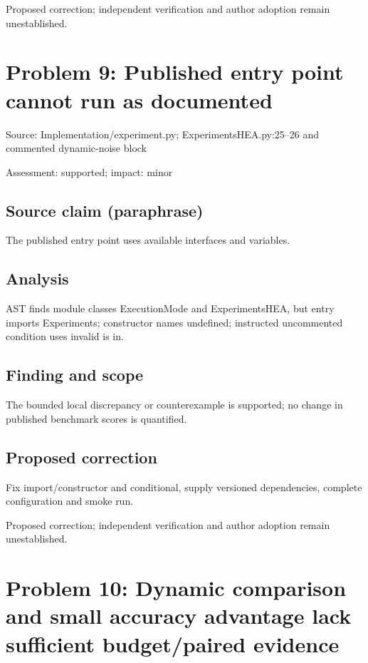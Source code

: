 \documentclass[11pt]{article}
\begin{document}
Proposed correction; independent verification and author adoption remain unestablished.

\section*{Problem 9: Published entry point cannot run as documented}

Source: Implementation/experiment.py; ExperimentsHEA.py:25–26 and commented dynamic-noise block

Assessment: supported; impact: minor

\subsection*{Source claim (paraphrase)}

The published entry point uses available interfaces and variables.

\subsection*{Analysis}

AST finds module classes ExecutionMode and ExperimentsHEA, but entry imports Experiments; constructor names undefined; instructed uncommented condition uses invalid is in.

\subsection*{Finding and scope}

The bounded local discrepancy or counterexample is supported; no change in published benchmark scores is quantified.

\subsection*{Proposed correction}

Fix import/constructor and conditional, supply versioned dependencies, complete configuration and smoke run.

Proposed correction; independent verification and author adoption remain unestablished.

\section*{Problem 10: Dynamic comparison and small accuracy advantage lack sufficient budget/paired evidence}
\end{document}
